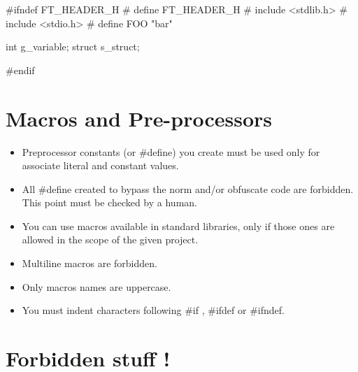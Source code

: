 \documentclass{42-en}
\begin{document}
        \begin{42ccode}
#ifndef FT_HEADER_H
# define FT_HEADER_H
# include <stdlib.h>
# include <stdio.h>
# define FOO "bar"

int g_variable;
struct s_struct;

#endif
        \end{42ccode}
        \newpage

    \section{Macros and Pre-processors}

        \begin{itemize}

            \item Preprocessor constants (or \#define) you create must be used
                only for associate literal and constant values.
            \item All \#define created to bypass the norm and/or obfuscate
                code are forbidden. This point must be checked by a human.
            \item You can use macros available in standard libraries, only
                if those ones are allowed in the scope of the given project.
            \item Multiline macros are forbidden.
            \item Only macros names are uppercase.
            \item You must indent characters following \#if , \#ifdef
                or \#ifndef.

        \end{itemize}
        \newpage


    \section{Forbidden stuff !}
\end{document}
